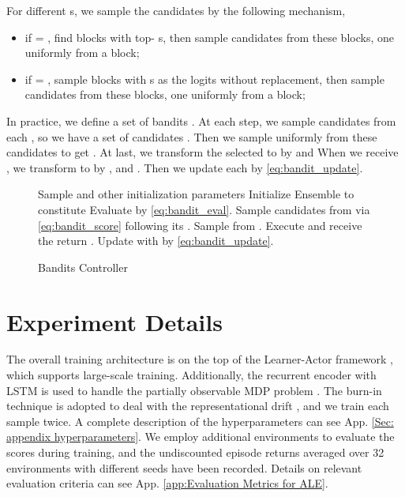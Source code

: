 \documentclass[nohyperref]{article}
\theoremstyle{plain}
\begin{document}
For different s, we sample the candidates by the following mechanism,
\begin{itemize}
    \item if  = , find blocks with top- s, then sample  candidates from these blocks, one uniformly from a block;
    \item if  = , sample  blocks with s as the logits without replacement, then sample  candidates from these blocks, one uniformly from a block;
\end{itemize}

In practice, we define a set of bandits .
At each step, we sample  candidates  from each , so we have a set of  candidates .
Then we sample uniformly from these  candidates to get . 
At last, we transform the selected  to  by  and 
When we receive , we transform  to  by , and  .
Then we update each  by \eqref{eq:bandit_update}.



\begin{figure}[ht]
  \centering
  \begin{minipage}{.9\linewidth}
    \begin{algorithm}[H]
      \caption{Bandits Controller}  
          \begin{algorithmic}
            \FOR{}
                \STATE Sample  and other initialization parameters
                \STATE Initialize 
                \STATE Ensemble  to constitute  
            \ENDFOR
            \WHILE{}  
                \FOR{}
                    \STATE Evaluate  by \eqref{eq:bandit_eval}.
                    \STATE Sample candidates   from  via \eqref{eq:bandit_score} following its .
                \ENDFOR
                \STATE Sample  from .
                \STATE Execute  and receive the return .
                \FOR{}
                    \STATE Update  with  by \eqref{eq:bandit_update}.
                \ENDFOR
            \ENDWHILE
          \end{algorithmic}  
        \label{alg:bva}
    \end{algorithm}
  \end{minipage}
\end{figure}


\clearpage


\section{Experiment Details}
\label{sec:app Experiment Details}

The overall training architecture is on the top of the Learner-Actor  framework \citep{impala}, which supports large-scale training. Additionally, the recurrent encoder with LSTM \citep{lstm} is used to handle the partially observable MDP problem \citep{ale}. 
The burn-in technique is adopted to deal with the representational drift \citep{r2d2}, and we train each sample twice.
A complete description of the hyperparameters  can see App. \ref{Sec: appendix hyperparameters}. 
We employ additional environments to evaluate the scores during training, and the undiscounted episode returns averaged over 32 environments with different seeds have been recorded. 
Details on relevant evaluation criteria  can see App. \ref{app:Evaluation Metrics for ALE}.
 
\end{document}
